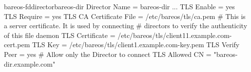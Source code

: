 \begin{bareosConfigResource}{bareos-fd}{director}{bareos-dir}
Director {
    Name = bareos-dir
    ...
    TLS Enable = yes
    TLS Require = yes
    TLS CA Certificate File = /etc/bareos/tls/ca.pem
    # This is a server certificate. It is used by connecting
    # directors to verify the authenticity of this file daemon
    TLS Certificate = /etc/bareos/tls/client11.example.com-cert.pem
    TLS Key = /etc/bareos/tls/client1.example.com-key.pem
    TLS Verify Peer = yes
    # Allow only the Director to connect
    TLS Allowed CN = "bareos-dir.example.com"
}
\end{bareosConfigResource}

